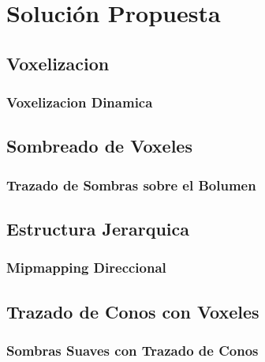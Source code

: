 \chapter{Solución Propuesta}
\label{chap:proposal}

\section{Voxelizacion} %
\label{sec:voxelizacion}

\subsection{Voxelizacion Dinamica} %
\label{sub:voxelizacion_dinamica}


\section{Sombreado de Voxeles}

\subsection{Trazado de Sombras sobre el Bolumen} %
\label{sub:trazado_de_sombras}


\section{Estructura Jerarquica} %
\label{sec:estructura_jerarquica}



\subsection{Mipmapping Direccional} %
\label{sub:mipmapping_direccioanl}


\section{Trazado de Conos con Voxeles} %
\label{sec:trazado_de_conos_con_voxeles}

\subsection{Sombras Suaves con Trazado de Conos} %
\label{sub:sombras_suaves_con_trazado_de_conos}

